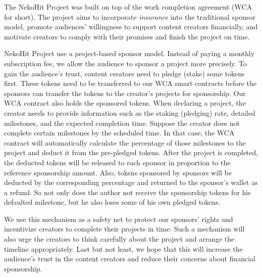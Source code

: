 The NekoHit Project was built on top of the work completion agreement (WCA
for short).
The project aims to incorporate \textit{insurance} into the traditional sponsor
model, promote audiences' willingness to support content creators financially,
and motivate creators to comply with their promises and finish the project
on time.

NekoHit Project use a project-based sponsor model.
Instead of paying a monthly subscription fee, we allow the audience to sponsor
a project more precisely.
To gain the audience's trust, content creators need to pledge (stake) some
tokens first.
These tokens need to be transferred to our WCA smart contracts before the
sponsors can transfer the tokens to the creator's projects for sponsorship.
Our WCA contract also holds the sponsored tokens.
When declaring a project, the creator needs to provide information such as
the staking (pledging) rate, detailed milestones, and the expected completion
time.
Suppose the creator does not complete certain milestones by the scheduled time.
In that case, the WCA contract will automatically calculate the percentage of
those milestones to the project and deduct it from the pre-pledged tokens.
After the project is completed, the deducted tokens will be released to each
sponsor in proportion to the reference sponsorship amount.
Also, tokens sponsored by sponsors will be deducted by the corresponding
percentage and returned to the sponsor's wallet as a refund.
So not only does the author not receive the sponsorship tokens for his defaulted
milestone, but he also loses some of his own pledged tokens.

We use this mechanism as a safety net to protect our sponsors' rights and
incentivize creators to complete their projects in time.
Such a mechanism will also urge the creators to think carefully about the
project and arrange the timeline appropriately.
Last but not least, we hope that this will increase the audience's trust in
the content creators and reduce their concerns about financial sponsorship.

